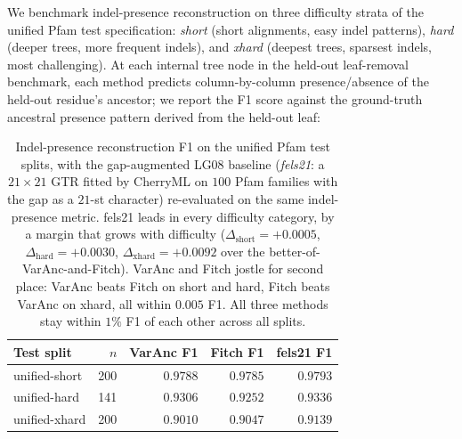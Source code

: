 
We benchmark indel-presence reconstruction on three difficulty
strata of the unified Pfam test specification: \emph{short}
(short alignments, easy indel patterns), \emph{hard} (deeper
trees, more frequent indels), and \emph{xhard} (deepest trees,
sparsest indels, most challenging).  At each internal tree node
in the held-out leaf-removal benchmark, each method predicts
column-by-column presence/absence of the held-out residue's
ancestor; we report the F1 score against the ground-truth
ancestral presence pattern derived from the held-out leaf:

\begin{table}[ht]
\centering\small
\begin{tabular}{lrrrr}
\toprule
Test split & $n$ & VarAnc F1 & Fitch F1 & fels21 F1 \\
\midrule
unified-short  & 200 & $0.9788$ & $0.9785$ & $0.9793$ \\
unified-hard   & 141 & $0.9306$ & $0.9252$ & $0.9336$ \\
unified-xhard  & 200 & $0.9010$ & $0.9047$ & $0.9139$ \\
\bottomrule
\end{tabular}
\caption{Indel-presence reconstruction F1 on the unified Pfam
test splits, with the gap-augmented LG08 baseline
(\emph{fels21}: a $21\times 21$ GTR fitted by CherryML on $100$
Pfam families with the gap as a $21$-st character) re-evaluated
on the same indel-presence metric.  fels21 leads in every
difficulty category, by a margin that grows with difficulty
($\Delta_{\text{short}} = +0.0005$, $\Delta_{\text{hard}} =
+0.0030$, $\Delta_{\text{xhard}} = +0.0092$ over the
better-of-VarAnc-and-Fitch).  VarAnc and Fitch jostle for second
place: VarAnc beats Fitch on short and hard, Fitch beats VarAnc
on xhard, all within $0.005$ F1.  All three methods stay within
$1\%$ F1 of each other across all splits.}
\label{tab:varanc-vs-fitch-f1}
\end{table}

